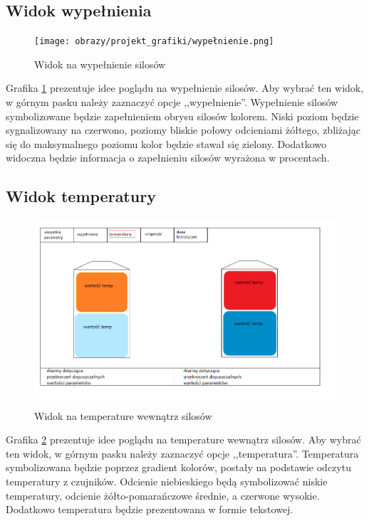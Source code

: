     \subsection{Widok wypełnienia}
        \begin{figure}[H]
            \centering
            \texttt{[image: obrazy/projekt\_grafiki/wypełnienie.png]}
            \caption{Widok na wypełnienie silosów}
            \label{fig: wypelnienie}
        \end{figure}

        Grafika \ref{fig: wypelnienie} prezentuje idee poglądu na wypełnienie silosów. Aby wybrać ten widok,
        w górnym pasku należy zaznaczyć opcje ,,wypełnienie''. Wypełnienie silosów symbolizowane będzie zapełnieniem
        obrysu silosów kolorem. Niski poziom będzie sygnalizowany na czerwono, poziomy bliskie połowy odcieniami żółtego,
        zbliżając się do maksymalnego poziomu kolor będzie stawał się zielony. Dodatkowo widoczna będzie informacja 
        o zapełnieniu silosów wyrażona w procentach.
    \subsection{Widok temperatury}
        \begin{figure}[H]
            \centering
            \includegraphics[width = \textwidth]{obrazy/projekt_grafiki/temperatura.png}
            \caption{Widok na temperature wewnątrz silosów}
            \label{fig: temperatura}
        \end{figure}

        Grafika \ref{fig: temperatura} prezentuje idee poglądu na temperature wewnątrz silosów. Aby wybrać ten widok,
        w górnym pasku należy zaznaczyć opcje ,,temperatura''. Temperatura symbolizowana będzie poprzez gradient kolorów,
        postały na podstawie odczytu temperatury z czujników. Odcienie niebieskiego będą symbolizować niskie temperatury,
        odcienie żółto-pomarańczowe średnie, a czerwone wysokie. Dodatkowo temperatura będzie prezentowana w formie 
        tekstowej.
